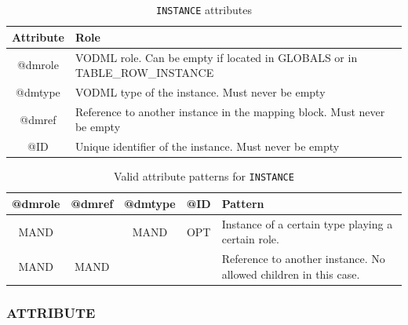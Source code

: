 \documentclass[11pt,a4paper]{ivoa}
\begin{document}
\begin{table}[!htbp]
\small
\centering
\begin{tabulary}{\linewidth}{|c|J|}       
       \hline 
            \textbf{Attribute} &  
            \textbf{Role}\\
       \hline  
            @dmrole    & 
            VODML role.  \newline Can be empty if located in GLOBALS or in TABLE\_ROW\_INSTANCE \\
       \hline  
            @dmtype & 
            VODML type of the instance.  \newline Must never be empty \\
       \hline  
            @dmref  & 
            Reference to another instance in the mapping block. 
            \newline  Must never be empty\\          
       \hline  
            @ID  & 
            Unique identifier of the instance. 
            \newline  Must never be empty\\
       \hline 
     \end{tabulary}
     \caption{\texttt{INSTANCE} attributes} 
     \label{tbl:inst-att}
 \end{table}

\begin{table}[!htbp]
\small
\centering
\begin{tabulary}{\linewidth}{|c|c|c|c|J|}
    \hline 
        \textbf{@dmrole} & 
        \textbf{@dmref} &  
        \textbf{@dmtype} &  
        \textbf{@ID} &  
        \textbf{Pattern}\\
    \hline      \hline  
        MAND &   
       & 
       MAND & 
       OPT & 
       Instance of a certain type playing a certain role. \\
    \hline  
       MAND  & 
       MAND  &  
       &  
       & 
       Reference to another instance. 
        \newline  No allowed children in this case.  \\
      \hline 
\end{tabulary}
     \caption{Valid attribute patterns for  \texttt{INSTANCE}} 
     \label{tbl:inst-pattern}
 \end{table}
\FloatBarrier
%
%

\subsubsection{ATTRIBUTE}
\end{document}
